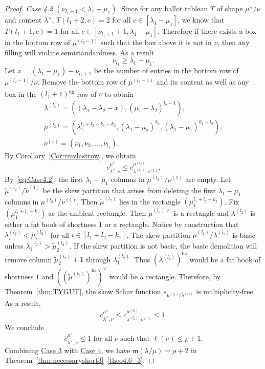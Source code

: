 \documentclass[ALCO,ThmDefs,Unicode,epreuves]{cedram}
\newcommand{\ba}{\mathsf{ba}}
\newcommand{\msf}{\mathsf{m}}
\let\hypertargeta\hypertarget %
\let\hyperlinka\hyperlink %
\newenvironment{Case}[1]{\par\vskip2pt\noindent%
\emph{#1}.}{\vskip2pt}
\begin{document}
\begin{proof}
\begin{Case}
{\hypertargeta{theo4.6_case4.2}{Case 4.2} $(\nu_{l_1+1} < \lambda_1-\mu_1)$} 
Since for any ballot tableau $T$ of shape $\mu^\vee/\nu$ and content $\lambda^\vee$, $T(l_1+2,c) = 2$ for all $c\in [\lambda_1-\mu_1]$, we know that $T(l_1+1,c) = 1$ for all $c\in [\nu_{l_1+1}+1,\lambda_1-\mu_1]$. Therefore if there exists a box in the bottom row of $\mu^{(l_2-1)}$ such that the box above it is not in $\nu$, then any filling will violate semistandardness. As a result
\begin{equation}
\label{eq:Case4.2}
 \nu_{l_1}\geq \lambda_1-\mu_1.
\end{equation}
Let $x = (\lambda_1-\mu_1)-\nu_{l_1+1}$ be the number of entries in the bottom row of $\mu^{(l_2-1)}/\nu$. Remove the bottom row of $\mu^{(l_2-1)}$ and its content as well as any box in the $(l_1+1)$\textsuperscript{th} row of $\nu$ to obtain
\[\begin{gathered}
\lambda^{(l_2)} = ((\lambda_1-\lambda_2-x),(\mu_1-\lambda_2)^{l_2-1}),
\\
\mu^{(l_2)} = (\lambda_1^{l_1+l_2-k_1-k_2}, (\lambda_1-\mu_2)^{k_2},(\lambda_1-\mu_1)^{k_1-l_2}),
\\
\nu^{(1)} = (\nu_1,\nu_2,\ldots,\nu_{l_1}).
\end{gathered}
\]
By Corollary~\ref{Cor:rmvlastrow}, we obtain
\[
c^{\mu^\vee}_{\lambda^\vee,\nu}\leq c^{\mu^{(l_2)}}_{\lambda^{(l_2)},\nu^{(1)}}.
\]
By~\eqref{eq:Case4.2}, the first $\lambda_1-\mu_1$ columns in $\mu^{(l_2)}/\nu^{(1)}$ are empty. Let $\tilde\mu^{(l_2)}/\tilde\nu^{(1)}$ be the skew partition that arises from deleting the first $\lambda_1-\mu_1$ columns in $\mu^{(l_2)}/\nu^{(1)}$.
Then $\tilde\mu^{(l_2)}$ lies in the rectangle $(\mu_1^{l_1+l_2-k_1})$. Fix $(\mu_1^{l_1+l_2-k_1})$ as the ambient rectangle. Then $\tilde\mu^{(l_2)\vee}$ is a rectangle and $\lambda^{(l_2)}$ is either a fat hook of shortness $1$ or a rectangle. Notice by construction that $\lambda^{(l_2)}_{i}< \tilde\mu^{(l_2)}_i$ for all $i\in [l_1+l_2-k_1]$. The skew partition $\tilde\mu^{(l_2)}/\lambda^{(l_2)}$ is basic unless $\lambda^{(l_2)}_1> \tilde\mu^{(l_2)}_2$. If the skew partition is not basic, the basic demolition will remove column $\tilde\mu^{(l_2)}_2+1$ through $\lambda^{(l_2)}_1$. Thus $(\lambda^{(l_2)})^{\ba }$ would be a fat hook of shortness $1$ and $((\tilde\mu^{(l_2)})^{\ba })^\vee$ would be a rectangle. 
Therefore, by Theorem~\ref{thm:TYGUT}, the skew Schur function $s_{\mu^{(l_2)}/\lambda^{(l_2)}}$ is multiplicity-free. As a result,
\[
c^{\mu^\vee}_{\lambda^\vee,\nu} \leq c^{ \mu^{(l_2)}}_{\lambda^{(l_2)},\nu^{(1)}} \leq 1.
\]
We conclude
\[
c^{\mu^\vee}_{\lambda^\vee,\nu} \leq 1 \text{ for all }\nu\text{ such that }\ell(\nu)\leq \rho+1.
\]
Combining \hyperlinka{theo4.6_case3}{Case 3} with \hyperlinka{theo4.6_case4}{Case 4}, we have ${\msf }(\lambda/\mu) = \rho+2$ in Theorem~\ref{thm:necessaryshort3}~\ref{theo4.6_3}.\qedhere
\end{Case}
\end{proof}
\end{document}
